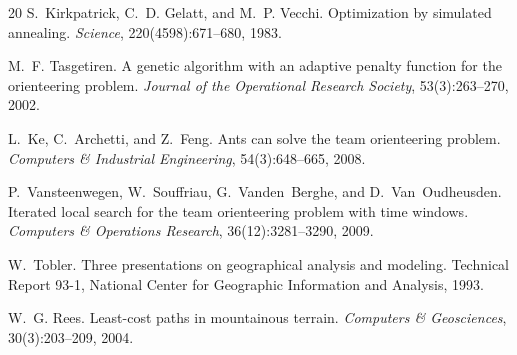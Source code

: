 \documentclass[11pt,a4paper]{article}
\begin{document}
\begin{thebibliography}{20}
S.~Kirkpatrick, C.~D. Gelatt, and M.~P. Vecchi.
\newblock Optimization by simulated annealing.
\newblock \emph{Science}, 220(4598):671--680, 1983.

M.~F. Tasgetiren.
\newblock A genetic algorithm with an adaptive penalty function for the orienteering problem.
\newblock \emph{Journal of the Operational Research Society}, 53(3):263--270, 2002.

L.~Ke, C.~Archetti, and Z.~Feng.
\newblock Ants can solve the team orienteering problem.
\newblock \emph{Computers \& Industrial Engineering}, 54(3):648--665, 2008.

P.~Vansteenwegen, W.~Souffriau, G.~Vanden~Berghe, and D.~Van~Oudheusden.
\newblock Iterated local search for the team orienteering problem with time windows.
\newblock \emph{Computers \& Operations Research}, 36(12):3281--3290, 2009.

W.~Tobler.
\newblock Three presentations on geographical analysis and modeling.
\newblock Technical Report 93-1, National Center for Geographic Information and Analysis, 1993.

W.~G. Rees.
\newblock Least-cost paths in mountainous terrain.
\newblock \emph{Computers \& Geosciences}, 30(3):203--209, 2004.

\end{thebibliography}
\end{document}

